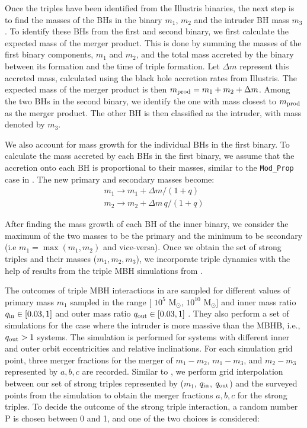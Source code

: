 \documentclass[twocolumn,linenumbers]{aastex701}
\newcommand{\msun}{M$_{\odot}$}
\newcommand{\qin}{$q_{\rm in}$}
\newcommand{\qout}{$q_{\rm out}$}
\begin{document}
Once the triples have been identified from the Illustris binaries, the next step is to find the masses of the BHs in the binary $m_1$, $m_2$ and the intruder BH mass $m_3$. To identify these BHs from the first and second binary, we first calculate the expected mass of the merger product. This is done by summing the masses of the first binary components, $m_1$ and $m_2$, and the total mass accreted by the binary between its formation and the time of triple formation. Let $\Delta m$ represent this accreted mass, calculated using the black hole accretion rates from Illustris. The expected mass of the merger product is then $m_{\rm prod} = m_1 + m_2 + \Delta m$. Among the two BHs in the second binary, we identify the one with mass closest to $m_{\rm prod}$ as the merger product. The other BH is then classified as the intruder, with mass denoted by $m_3$.

We also account for mass growth for the individual BHs in the first binary. To calculate the mass accreted by each BHs in the first binary, we assume that the accretion onto each BH is proportional to their masses, similar to the \texttt{Mod\_Prop} case in \cite{Siwek_2020}. The new primary and secondary masses become:
\begin{eqnarray}
    \label{eq: m1m2 accreted mass}
    m_{1} \rightarrow m_{1} +  \Delta m/(1+q)\\
    m_{2} \rightarrow  m_{2} +  \Delta m  \, q / (1+q)
\end{eqnarray}

After finding the mass growth of each BH of the inner binary, we consider the maximum of the two masses to be the primary and the minimum to be secondary (i.e $m_1 = \max (m_1,m_2)$ and vice-versa). Once we obtain the set of strong triples and their masses ($m_1,m_2,m_3$), we incorporate triple dynamics with the help of results from the triple MBH simulations from \citet{bonetti_post-newtonian_2018-1}. 

The outcomes of triple MBH interactions in \citet{bonetti_post-newtonian_2018-1} are sampled for different values of primary mass $m_1$ sampled in the range [ $10^5$ \msun{}, $10^{10}$ \msun{}] and inner mass ratio $q_{\rm in} \in [0.03,1]$ and outer mass ratio $q_{\rm out} \in [0.03,1]$ . They also perform a set of simulations for the case where the intruder is more massive than the MBHB, i.e., $q_{\rm out} > 1$ systems. The simulation is performed for systems with different inner and outer orbit eccentricities and relative inclinations. For each simulation grid point, three merger fractions for the merger of $m_1-m_2$, $m_1-m_3$, and $m_2-m_3$ represented by $a,b,c$ are recorded. Similar to \citet{bonetti_post-newtonian_2018}, we perform grid interpolation between our set of strong triples represented by ($m_1$, \qin, \qout) and the surveyed points from the simulation to obtain the merger fractions $a,b,c$  for the strong triples. To decide the outcome of the strong triple interaction, a random number P is chosen between 0 and 1, and one of the two choices is considered:
\end{document}

